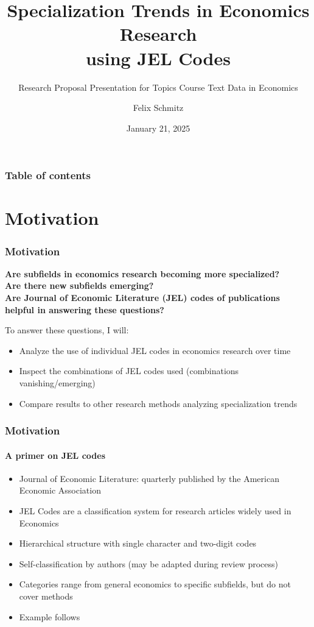 \documentclass[aspectratio=1610]{beamer}
\title{Specialization Trends in Economics Research\\
using JEL Codes}
\subtitle{Research Proposal Presentation for Topics Course Text Data in Economics}
\date{January 21, 2025}
\author{Felix Schmitz}
\begin{document}

\begin{frame}[plain]
	\titlepage
\end{frame}

\begin{framecontent}
	\frametitle{Table of contents}
\end{framecontent}

\section{Motivation}

\begin{frame}
	\frametitle{Motivation}
	\begin{center}
		\bfseries{
			Are subfields in economics research becoming more specialized?\\
			Are there new subfields emerging?\\
			Are Journal of Economic Literature (JEL) codes of publications helpful in answering these questions?
		}
	\end{center}

	To answer these questions, I will:
	\begin{itemize}
		\item Analyze the use of individual JEL codes in economics research over time
		\item Inspect the combinations of JEL codes used (combinations vanishing/emerging)
		\item Compare results to other research methods analyzing specialization trends
	\end{itemize}
\end{frame}

\begin{frame}
	\frametitle{Motivation}
	\framesubtitle{A primer on JEL codes}
	\begin{itemize}
		\item Journal of Economic Literature: quarterly published by the American Economic Association
		\item JEL Codes are a classification system for research articles widely used in Economics
		\item Hierarchical structure with single character and two-digit codes
		\item Self-classification by authors (may be adapted during review process)
		\item Categories range from general economics to specific subfields, but do not cover methods
		\item Example follows
	\end{itemize}
\end{frame}
\end{document}
